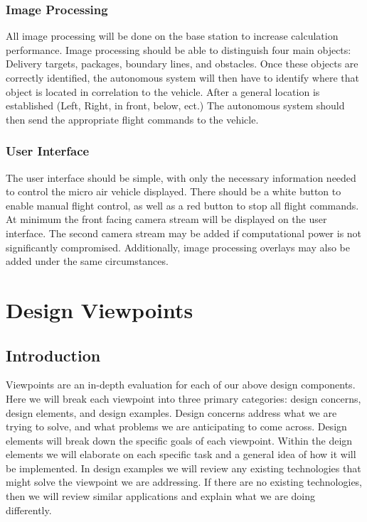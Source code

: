 \documentclass[onecolumn, draftclsnofoot,10pt, compsoc]{IEEEtran}
\begin{document}
\subsubsection{Image Processing}

All image processing will be done on the base station to increase calculation performance. Image processing should be able to distinguish four main objects: Delivery targets, packages, boundary lines, and obstacles. Once these objects are correctly identified, the autonomous system will then have to identify where that object is located in correlation to the vehicle. After a general location is established (Left, Right, in front, below, ect.) The autonomous system should then send the appropriate flight commands to the vehicle. 

\subsubsection{User Interface}

The user interface should be simple, with only the necessary information needed to control the micro air vehicle displayed. There should be a white button to enable manual flight control, as well as a red button to stop all flight commands. At minimum the front facing camera stream will be displayed on the user interface. The second camera stream may be added if computational power is not significantly compromised. Additionally, image processing overlays may also be added under the same circumstances. 



\section{Design Viewpoints} %

\subsection{Introduction}  
	Viewpoints are an in-depth evaluation for each of our above design components. Here we will break each viewpoint into three primary categories: design concerns, design elements, and design examples. Design concerns address what we are trying to solve, and what problems we are anticipating to come across. Design elements will break down the specific goals of each viewpoint. Within the deign elements we will elaborate on each specific task and a general idea of how it will be implemented. In design examples we will review any existing technologies that might solve the viewpoint we are addressing. If there are no existing technologies, then we will review similar applications and explain what we are doing differently. 
\end{document}
